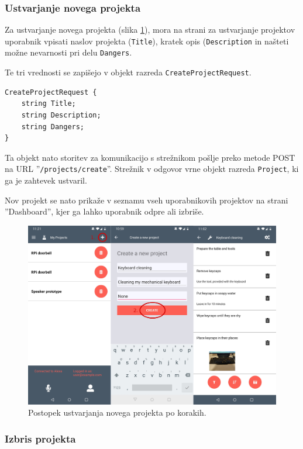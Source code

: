 \documentclass[a4paper, 12pt]{book}
\begin{document}
\subsubsection{Ustvarjanje novega projekta}

Za ustvarjanje novega projekta (slika \ref{app_newproject}), mora na strani za ustvarjanje projektov uporabnik vpisati naslov projekta (\texttt{Title}), kratek opis (\texttt{Description} in našteti možne nevarnosti pri delu \texttt{Dangers}.

Te tri vrednosti se zapišejo v objekt razreda \texttt{CreateProjectRequest}.
\begin{Verbatim}[commandchars=+\[\]]
CreateProjectRequest {
    string Title;
    string Description;
    string Dangers;
}
\end{Verbatim}

Ta objekt nato storitev za komunikacijo s strežnikom pošlje preko metode POST na URL ''\texttt{/projects/create}''.
Strežnik v odgovor vrne objekt razreda \texttt{Project}, ki ga je zahtevek ustvaril.

Nov projekt se nato prikaže v seznamu vseh uporabnikovih projektov na strani ''Dashboard'', kjer ga lahko uporabnik odpre ali izbriše.

\begin{figure}[H]
\begin{center}
\includegraphics[width=13cm]{app_newproject}
\end{center}
	\caption{Postopek ustvarjanja novega projekta po korakih.}
\label{app_newproject}
\end{figure}

\subsubsection{Izbris projekta}
\end{document}
